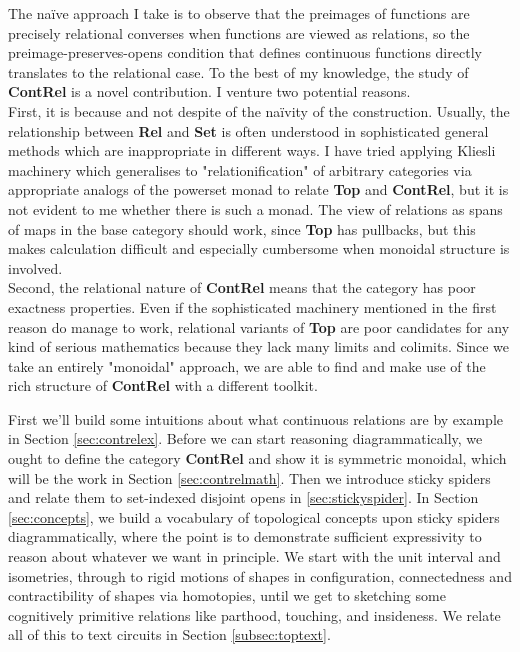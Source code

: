 
The na\"{i}ve approach I take is to observe that the preimages of functions are precisely relational converses when functions are viewed as relations, so the preimage-preserves-opens condition that defines continuous functions directly translates to the relational case. To the best of my knowledge, the study of \textbf{ContRel} is a novel contribution. I venture two potential reasons.\\

First, it is because and not despite of the na\"{i}vity of the construction. Usually, the relationship between \textbf{Rel} and \textbf{Set} is often understood in sophisticated general methods which are inappropriate in different ways. I have tried applying Kliesli machinery which generalises to "relationification" of arbitrary categories via appropriate analogs of the powerset monad to relate \textbf{Top} and \textbf{ContRel}, but it is not evident to me whether there is such a monad. The view of relations as spans of maps in the base category should work, since \textbf{Top} has pullbacks, but this makes calculation difficult and especially cumbersome when monoidal structure is involved.\\

Second, the relational nature of \textbf{ContRel} means that the category has poor exactness properties. Even if the sophisticated machinery mentioned in the first reason do manage to work, relational variants of \textbf{Top} are poor candidates for any kind of serious mathematics because they lack many limits and colimits. Since we take an entirely "monoidal" approach, we are able to find and make use of the rich structure of \textbf{ContRel} with a different toolkit.

 First we'll build some intuitions about what continuous relations are by example in Section \ref{sec:contrelex}. Before we can start reasoning diagrammatically, we ought to define the category \textbf{ContRel} and show it is symmetric monoidal, which will be the work in Section \ref{sec:contrelmath}. Then we introduce sticky spiders and relate them to set-indexed disjoint opens in \ref{sec:stickyspider}. In Section \ref{sec:concepts}, we build a vocabulary of topological concepts upon sticky spiders diagrammatically, where the point is to demonstrate sufficient expressivity to reason about whatever we want in principle. We start with the unit interval and isometries, through to rigid motions of shapes in configuration, connectedness and contractibility of shapes via homotopies, until we get to sketching some cognitively primitive relations like parthood, touching, and insideness. We relate all of this to text circuits in Section \ref{subsec:toptext}.

\clearmargin
